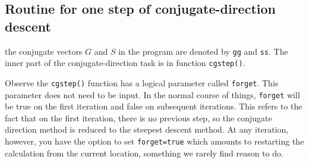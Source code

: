 \subsection{Routine for one step of conjugate-direction descent}
\par
\begin{comment}
The \bx{conjugate-direction program}
can be divided into two parts:
an inner part that is used almost without change
over a wide variety of applications,
and an outer part containing memory allocations,
operator invocations, and initializations.

Because \bx{Fortran} does not recognize the difference between upper- and
lower-case letters,
\end{comment}
the conjugate vectors $G$ and $S$ in the program are denoted by
{\tt gg} and {\tt ss}.
The inner part of the conjugate-direction task is in
function {\tt cgstep()}.%
\par
Observe the \texttt{cgstep()} function has a logical parameter
called \texttt{forget}.
This parameter does not need to be input.
In the normal course of things, \texttt{forget} will be true
on the first iteration and false on subsequent iterations.
This refers to the fact that on the first iteration,
there is no previous step,
so the conjugate direction method
is reduced to the steepest descent method.
At any iteration, however, you have the option to set
\texttt{forget=true}
which amounts to restarting the calculation
from the current location,
something we rarely find reason to do.


